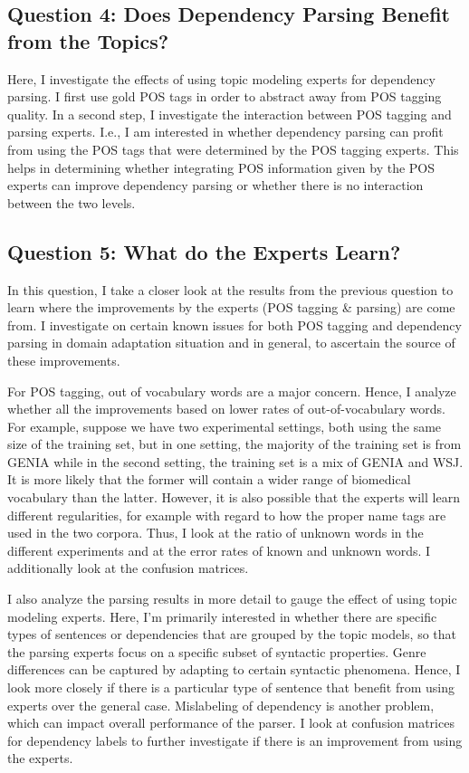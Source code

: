\subsection*{Question 4: Does Dependency Parsing Benefit from the Topics?}

Here, I investigate the effects of using topic modeling experts for dependency parsing. I first use gold POS tags in order to abstract away from POS tagging quality. In a second step, I investigate the interaction between POS tagging and parsing experts. I.e., I am interested in whether dependency parsing can profit from using the POS tags that were determined by the POS tagging experts. This helps in determining whether integrating POS information given by the POS experts can improve dependency parsing or whether there is no interaction between the two levels.

\subsection*{Question 5: What do the Experts Learn?}

In this question, I take a closer look at the results from the previous question to learn where the improvements by the experts (POS tagging \& parsing) are come from. I investigate on certain known issues for both POS tagging and dependency parsing in domain adaptation situation and in general, to ascertain the source of these improvements. 

For POS tagging, out of vocabulary words are a major concern. Hence, I analyze whether all the improvements based on lower rates of out-of-vocabulary words. For example, suppose we have two experimental settings, both using the same size of the training set, but in one setting, the majority of the training set is from GENIA while in the second setting, the training set is a mix of GENIA and WSJ. It is more likely that the former will contain a wider range of biomedical vocabulary than the latter. However, it is also possible that the experts will learn different regularities, for example with regard to how the proper name tags are used in the two corpora. Thus, I look at the ratio of unknown words in the different experiments and at the error rates of known and unknown words. I additionally look at the confusion matrices.

I also analyze the parsing results in more detail to gauge the effect of using topic modeling experts. Here, I'm primarily interested in whether there are specific types of sentences or dependencies that are grouped by the topic models, so that the parsing experts focus on a specific subset of syntactic properties. Genre differences can be captured by adapting to certain syntactic phenomena. Hence, I look more closely if there is a particular type of sentence that benefit from using experts over the general case. Mislabeling of dependency is another problem, which can impact overall performance of the parser. I look at confusion matrices for dependency labels to further investigate if there is an improvement from using the experts. 

